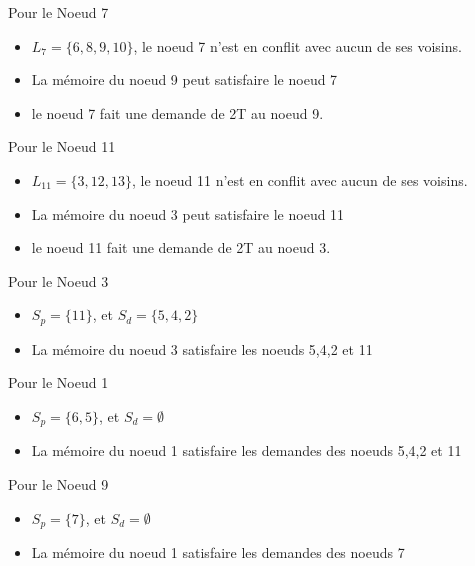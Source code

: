 \documentclass[10pt, c]{beamer}
\begin{document}
    \begin{frame}{Pour le Noeud 7}
    \begin{itemize}
        \item  $L_7 = \{6,8,9,10\}$, le noeud 7 n'est en conflit avec aucun de ses voisins. 
        \item La mémoire du noeud 9 peut satisfaire le noeud 7
        \item le noeud 7 fait une demande de 2T au noeud 9.
    \end{itemize}
    \end{frame}
    \begin{frame}{Pour le Noeud 11}
    \begin{itemize}
        \item  $L_{11} = \{3,12,13\}$, le noeud 11 n'est en conflit avec aucun de ses voisins. 
        \item La mémoire du noeud 3 peut satisfaire le noeud 11
        \item le noeud 11 fait une demande de 2T au noeud 3.
    \end{itemize}
    \end{frame}
     \begin{frame}{Pour le Noeud 3}
    \begin{itemize}
        \item  $S_{p} = \{11\}$, et  $S_{d} = \{5,4,2\}$
        \item La mémoire du noeud 3  satisfaire les noeuds 5,4,2 et 11
    \end{itemize}
    \end{frame}
    \begin{frame}{Pour le Noeud 1}
    \begin{itemize}
        \item  $S_{p} = \{6,5\}$, et  $S_{d} = \emptyset$
        \item La mémoire du noeud 1  satisfaire les demandes des noeuds 5,4,2 et 11
    \end{itemize}
    \end{frame}
     \begin{frame}{Pour le Noeud 9}
    \begin{itemize}
        \item  $S_{p} = \{7\}$, et  $S_{d} = \emptyset$
        \item La mémoire du noeud 1  satisfaire les demandes des noeuds 7
    \end{itemize}
    \end{frame}
% 
%
\end{document}
